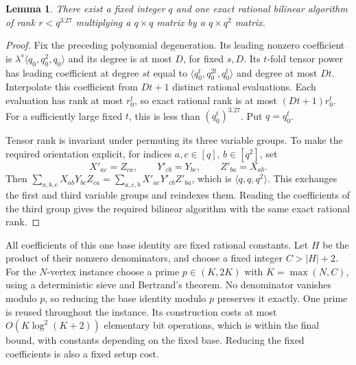 \documentclass[acmlarge,11pt,screen,nonacm]{acmart}
\newtheorem{lemma}[theorem]{Lemma}
\begin{document}
\begin{lemma}\label{lem:exactbase}
There exist a fixed integer $q$ and one exact rational bilinear algorithm
of rank $r<q^{3.27}$ multiplying a $q\times q$ matrix by a $q\times q^2$
matrix.
\end{lemma}
\begin{proof}
Fix the preceding polynomial degeneration. Its leading nonzero coefficient
is $\lambda^s\langle q_0,q_0^2,q_0\rangle$ and its degree is at most $D$,
for fixed $s,D$. Its $t$-fold tensor power has leading coefficient at degree
$st$ equal to $\langle q_0^t,q_0^{2t},q_0^t\rangle$ and degree at most $Dt$.
Interpolate this coefficient from $Dt+1$ distinct rational evaluations.
Each evaluation has rank at most $r_0^t$, so exact rational rank is at most
$(Dt+1)r_0^t$. For a sufficiently large fixed $t$, this is less than
$(q_0^t)^{3.27}$. Put $q=q_0^t$.

Tensor rank is invariant under permuting its three variable groups. To make
the required orientation explicit, for indices $a,c\in[q]$, $b\in[q^2]$,
set
\[
 X'_{ac}=Z_{ca},\qquad Y'_{cb}=Y_{bc},\qquad Z'_{ba}=X_{ab}.
\]
Then $\sum_{a,b,c}X_{ab}Y_{bc}Z_{ca}
=\sum_{a,c,b}X'_{ac}Y'_{cb}Z'_{ba}$, which is
$\langle q,q,q^2\rangle$. This exchanges the first and third variable
groups and reindexes them. Reading the coefficients of the third group
gives the required bilinear algorithm with the same exact rational rank.
\end{proof}

All coefficients of this one base identity are fixed rational constants.
Let $H$ be the product of their nonzero denominators, and choose a fixed
integer $C>|H|+2$. For the $N$-vertex instance choose a prime
$p\in(K,2K)$ with $K=\max(N,C)$, using a deterministic sieve and Bertrand's
theorem. No denominator vanishes modulo $p$, so reducing the base identity
modulo $p$ preserves it exactly. One prime is reused throughout the instance.
Its construction costs at most $O(K\log^2(K+2))$ elementary bit operations,
which is within the final bound, with constants depending on the fixed base.
Reducing the fixed coefficients is also a fixed setup cost.
\end{document}
